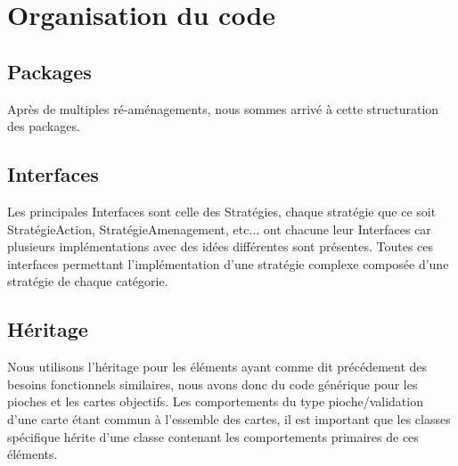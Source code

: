 \chapter{Organisation du code }

\section{Packages}

\begin{minipage}{0.45\textwidth}
\end{minipage}
\begin{minipage}{0.45\textwidth}
  Après de multiples ré-aménagements, nous sommes arrivé à cette structuration des packages.\\
  
\end{minipage}

\section{Interfaces}
Les principales Interfaces sont celle des Stratégies, chaque stratégie que ce soit StratégieAction, StratégieAmenagement, etc... ont chacune leur Interfaces car plusieurs implémentations avec des idées différentes sont présentes. Toutes ces interfaces permettant l'implémentation d'une stratégie complexe composée d'une stratégie de chaque catégorie. 

\section{Héritage}
Nous utilisons l'héritage pour les éléments ayant comme dit précédement des besoins fonctionnels similaires, nous avons donc du code générique pour les pioches et les cartes objectifs. Les comportements du type pioche/validation d'une carte étant commun à l'essemble des cartes, il est important que les classes spécifique hérite d'une classe contenant les comportements primaires de ces éléments.